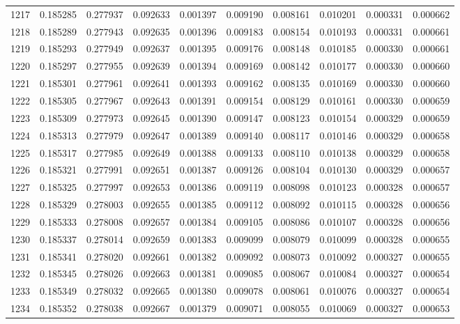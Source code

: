 \begin{tabular}{lrrrrrrrrr}
1217 & 0.185285 & 0.277937 & 0.092633 & 0.001397 & 0.009190 & 0.008161 & 0.010201 & 0.000331 & 0.000662 \\
1218 & 0.185289 & 0.277943 & 0.092635 & 0.001396 & 0.009183 & 0.008154 & 0.010193 & 0.000331 & 0.000661 \\
1219 & 0.185293 & 0.277949 & 0.092637 & 0.001395 & 0.009176 & 0.008148 & 0.010185 & 0.000330 & 0.000661 \\
1220 & 0.185297 & 0.277955 & 0.092639 & 0.001394 & 0.009169 & 0.008142 & 0.010177 & 0.000330 & 0.000660 \\
1221 & 0.185301 & 0.277961 & 0.092641 & 0.001393 & 0.009162 & 0.008135 & 0.010169 & 0.000330 & 0.000660 \\
1222 & 0.185305 & 0.277967 & 0.092643 & 0.001391 & 0.009154 & 0.008129 & 0.010161 & 0.000330 & 0.000659 \\
1223 & 0.185309 & 0.277973 & 0.092645 & 0.001390 & 0.009147 & 0.008123 & 0.010154 & 0.000329 & 0.000659 \\
1224 & 0.185313 & 0.277979 & 0.092647 & 0.001389 & 0.009140 & 0.008117 & 0.010146 & 0.000329 & 0.000658 \\
1225 & 0.185317 & 0.277985 & 0.092649 & 0.001388 & 0.009133 & 0.008110 & 0.010138 & 0.000329 & 0.000658 \\
1226 & 0.185321 & 0.277991 & 0.092651 & 0.001387 & 0.009126 & 0.008104 & 0.010130 & 0.000329 & 0.000657 \\
1227 & 0.185325 & 0.277997 & 0.092653 & 0.001386 & 0.009119 & 0.008098 & 0.010123 & 0.000328 & 0.000657 \\
1228 & 0.185329 & 0.278003 & 0.092655 & 0.001385 & 0.009112 & 0.008092 & 0.010115 & 0.000328 & 0.000656 \\
1229 & 0.185333 & 0.278008 & 0.092657 & 0.001384 & 0.009105 & 0.008086 & 0.010107 & 0.000328 & 0.000656 \\
1230 & 0.185337 & 0.278014 & 0.092659 & 0.001383 & 0.009099 & 0.008079 & 0.010099 & 0.000328 & 0.000655 \\
1231 & 0.185341 & 0.278020 & 0.092661 & 0.001382 & 0.009092 & 0.008073 & 0.010092 & 0.000327 & 0.000655 \\
1232 & 0.185345 & 0.278026 & 0.092663 & 0.001381 & 0.009085 & 0.008067 & 0.010084 & 0.000327 & 0.000654 \\
1233 & 0.185349 & 0.278032 & 0.092665 & 0.001380 & 0.009078 & 0.008061 & 0.010076 & 0.000327 & 0.000654 \\
1234 & 0.185352 & 0.278038 & 0.092667 & 0.001379 & 0.009071 & 0.008055 & 0.010069 & 0.000327 & 0.000653 \\

\end{tabular}
